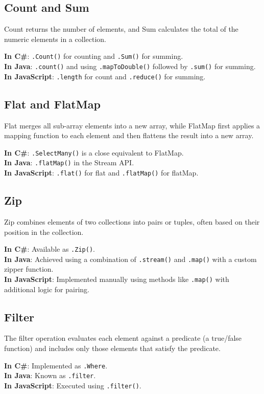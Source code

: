 \subsection*{Count and Sum}
Count returns the number of elements, and Sum calculates the total of the numeric elements in a collection.

\textbf{In C\#}: \texttt{.Count()} for counting and \texttt{.Sum()} for summing. \\
\textbf{In Java}: \texttt{.count()} and using \texttt{.mapToDouble()} followed by \texttt{.sum()} for summing. \\
\textbf{In JavaScript}: \texttt{.length} for count and \texttt{.reduce()} for summing.

\subsection*{Flat and FlatMap}
Flat merges all sub-array elements into a new array, while FlatMap first applies a mapping function to each element and then flattens the result into a new array.

\textbf{In C\#}: \texttt{.SelectMany()} is a close equivalent to FlatMap. \\
\textbf{In Java}: \texttt{.flatMap()} in the Stream API. \\
\textbf{In JavaScript}: \texttt{.flat()} for flat and \texttt{.flatMap()} for flatMap.

\subsection*{Zip}
Zip combines elements of two collections into pairs or tuples, often based on their position in the collection.

\textbf{In C\#}: Available as \texttt{.Zip()}. \\
\textbf{In Java}: Achieved using a combination of \texttt{.stream()} and \texttt{.map()} with a custom zipper function. \\
\textbf{In JavaScript}: Implemented manually using methods like \texttt{.map()} with additional logic for pairing.

\subsection*{Filter}
The filter operation evaluates each element against a predicate (a true/false function) and includes only those elements that satisfy the predicate.

\textbf{In C\#}: Implemented as \texttt{.Where}. \\
\textbf{In Java}: Known as \texttt{.filter}. \\
\textbf{In JavaScript}: Executed using \texttt{.filter()}.


